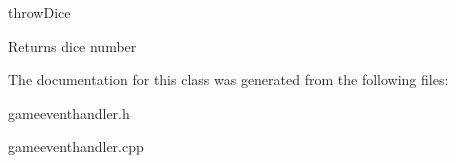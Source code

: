 throw\-Dice 

\begin{DoxyReturn}{Returns}
dice number 
\end{DoxyReturn}


The documentation for this class was generated from the following files\-:\begin{DoxyCompactItemize}
\item 
gameeventhandler.\-h\item 
gameeventhandler.\-cpp\end{DoxyCompactItemize}
